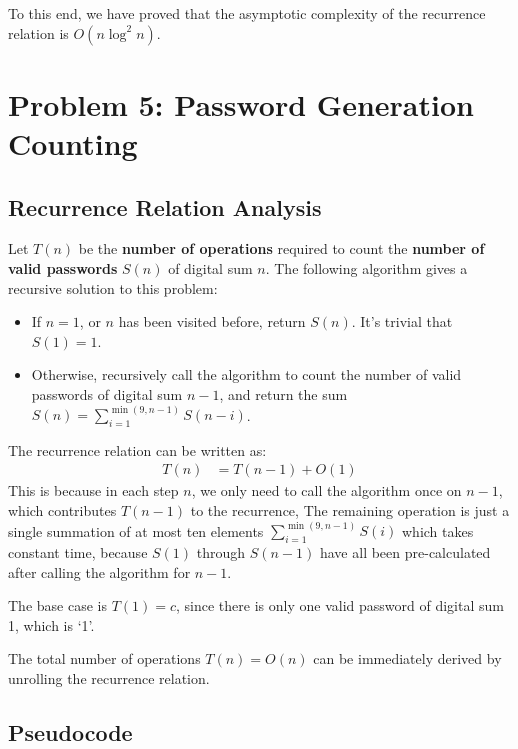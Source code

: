 \documentclass[11pt, a4paper, oneside]{memoir}
\begin{document}

To this end, we have proved that the asymptotic complexity of the recurrence relation is $O(n \log^2 n)$.

\chapter{Problem 5: Password Generation Counting}
\section{Recurrence Relation Analysis}
Let $T(n)$ be the \textbf{number of operations} required to count the \textbf{number of valid passwords} $S(n)$ of digital sum $n$.
The following algorithm gives a recursive solution to this problem:
\begin{itemize}
    \item If $n = 1$, or $n$ has been visited before, return $S(n)$. It's trivial that $S(1) = 1$.
    \item Otherwise, recursively call the algorithm to count the number of valid passwords of digital sum $n-1$, and return the sum $S(n) = \sum_{i=1}^{\min(9, n-1)} S(n-i)$.
\end{itemize}
The recurrence relation can be written as:
\begin{align*}
    T(n) & = T(n-1) + O(1)
\end{align*}
This is because in each step $n$, we only need to call the algorithm once on $n-1$, which contributes $T(n-1)$ to the recurrence,
The remaining operation is just a single summation of at most ten elements $\sum_{i=1}^{\min(9, n-1)} S(i)$ which takes constant time, because $S(1)$ through $S(n-1)$ have all been pre-calculated after calling the algorithm for $n-1$.

The base case is $T(1) = c$, since there is only one valid password of digital sum 1, which is `1'.

The total number of operations $T(n)=O(n)$ can be immediately derived by unrolling the recurrence relation.
\section{Pseudocode}
\end{document}
